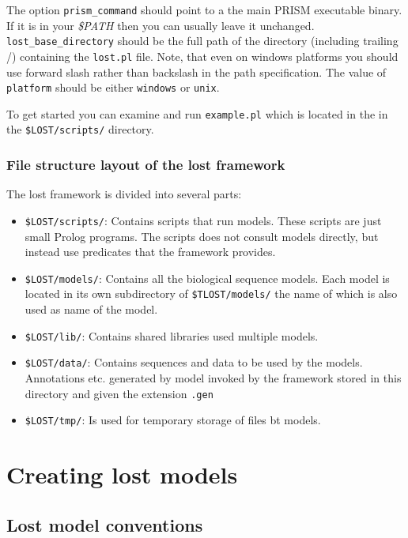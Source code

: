 \documentclass{book}
\begin{document}
The option \texttt{prism\_command} should point to a the main PRISM executable
binary. If it is in your  \emph{\$PATH} then you can usually leave it unchanged.\\
\texttt{lost\_base\_directory} should be the full path of the
directory (including trailing /) containing the \texttt{lost.pl}
file.  Note, that even on windows platforms you should use forward
slash rather than backslash in the path specification. The value of
\texttt{platform} should be either \texttt{windows} or \texttt{unix}. 

To get started you can examine and run \texttt{example.pl} which 
is located in the in the \texttt{\$LOST/scripts/} directory.

\subsection{File structure layout of the lost framework}

The lost framework is divided into several parts:
\begin{itemize}
\item \texttt{\$LOST/scripts/}: Contains scripts that run
  models. These scripts are just small Prolog programs. The scripts
  does not consult models directly, but instead use predicates that
  the framework provides.
\item \texttt{\$LOST/models/}: Contains all the biological sequence
  models. Each model is located in its own subdirectory of
  \texttt{\$TLOST/models/} the name of which is also used as name of
  the model.
\item \texttt{\$LOST/lib/}: Contains shared libraries used multiple
  models.
\item \texttt{\$LOST/data/}: Contains sequences and data to be used by
  the models. Annotations etc. generated by model invoked by the
  framework stored in this directory and given the extension
  \texttt{.gen} 
\item \texttt{\$LOST/tmp/}: Is used for temporary storage of files bt models.
\end{itemize}


\chapter{Creating lost models}

\section{Lost model conventions}\label{sec:lostmodelconventions}
\end{document}
